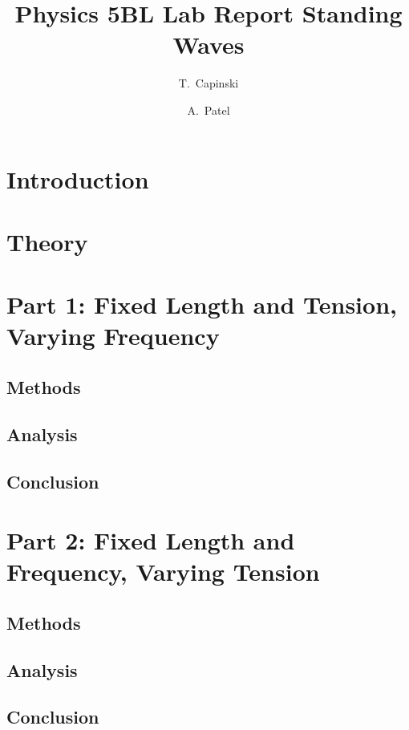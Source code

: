 \documentclass[11pt]{article}
\title{Physics 5BL Lab Report Standing Waves}
\author{T.~Capinski \and A.~Patel}
\let\oldsection\section
\renewcommand\section{\clearpage\oldsection}
\begin{document}
    \maketitle
    \tableofcontents

    \section*{Introduction}\label{sec:introduction}

    \section*{Theory}\label{sec:theory}

    \section{Part 1: Fixed Length and Tension, Varying Frequency}\label{sec:part_1}
    \subsection{Methods}\label{subsec:part_1_methods}
    \subsection{Analysis}\label{subsec:part_1_analysis}
    \subsection{Conclusion}\label{subsec:part_1_conclusion}

    \section{Part 2: Fixed Length and Frequency, Varying Tension }\label{sec:part_2}
    \subsection{Methods}\label{subsec:part_2_methods}
    \subsection{Analysis}\label{subsec:part_2_analysis}
    \subsection{Conclusion}\label{subsec:part_2_conclusion}
\end{document}
